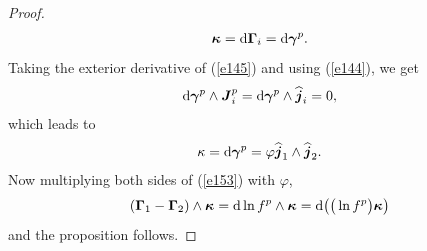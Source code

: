 \documentclass[10pt,a4paper]{amsart}
\numberwithin{equation}{section}
\begin{document}
\begin{proof}
\begin{gather*}
\boldsymbol{\kappa }={\rm d}\boldsymbol{\Gamma }_{i}={\rm d}\boldsymbol{\gamma }^{p}.
\end{gather*}
Taking the exterior derivative of (\ref{e145}) and using (\ref{e144}), we get
\begin{gather*}
{\rm d}\boldsymbol{\gamma }^{p}\wedge \boldsymbol{J}_{i}^{p}={\rm d}\boldsymbol{\gamma }^{p}\wedge \widehat{\boldsymbol{j}}_{i}=0,
\end{gather*}
which leads to
\begin{gather}
\kappa ={\rm d}\boldsymbol{\gamma }^{p}=\varphi \widehat{\boldsymbol{j}}_{1}\wedge \widehat{\boldsymbol{j}}_{2}. \label{e156}
\end{gather}
Now multiplying both sides of (\ref{e153}) with $\varphi $,
\begin{gather*}
( \boldsymbol{\Gamma }_{1}-\boldsymbol{\Gamma }_{2}) \wedge \boldsymbol{\kappa }={\rm d}\ln f^{p}\wedge \boldsymbol{\kappa }={\rm d}\big( \big( \ln f^{p}\big) \boldsymbol{\kappa }\big)
\end{gather*}
and the proposition follows.
\end{proof}
\end{document}
